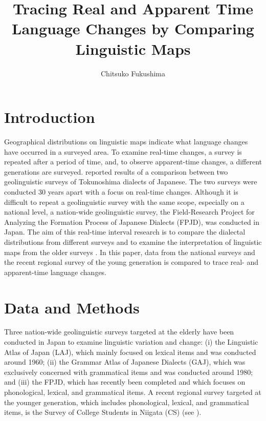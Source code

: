 \documentclass[output=paper]{LSP/langsci}
\author{Chitsuko Fukushima\affiliation{University of Niigata Prefecture, Faculty of International Studies and Regional Development}}
\title{Tracing Real and Apparent Time Language Changes by Comparing Linguistic Maps}
\begin{document}
\section{Introduction}
Geographical distributions on linguistic maps indicate what language changes have occurred in a surveyed area. To examine real-time changes, a survey is repeated after a period of time, and, to observe apparent-time changes, a different generations are surveyed. \citet{fukushima_revisiting_2013} reported results of a comparison between two geolinguistic surveys of Tokunoshima dialects of Japanese. The two surveys were conducted 30 years apart with a focus on real-time changes. Although it is difficult to repeat a geolinguistic survey with the same scope, especially on a national level, a nation-wide geolinguistic survey, the Field-Research Project for Analyzing the Formation Process of Japanese Dialects (FPJD), was conducted in Japan. The aim of this real-time interval research is to compare the dialectal distributions from different surveys and to examine the interpretation of linguistic maps from the older surveys \citep{onishi_timespan_2014}. In this paper, data from the national surveys and the recent regional survey of the young generation is compared to trace real- and apparent-time language changes.

\section{Data and Methods}

Three nation-wide geolinguistic surveys targeted at the elderly have been conducted in Japan to examine linguistic variation and change: (i) the Linguistic Atlas of Japan (LAJ), which mainly focused on lexical items and was conducted around 1960; (ii) the Grammar Atlas of Japanese Dialects (GAJ), which was exclusively concerned with grammatical items and was conducted around 1980; and (iii) the FPJD, which has recently been completed and which focuses on phonological, lexical, and grammatical items. A recent regional survey targeted at the younger generation, which includes phonological, lexical, and grammatical items, is the Survey of College Students in Niigata (CS) (see ).
\end{document}

